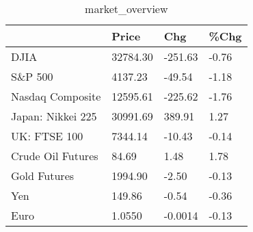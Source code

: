 \documentclass{article}%
\begin{document}
%


\begin{table}[htbp]%
\caption{market\_overview}%
\centering%
\begin{adjustbox}{width=1\textwidth}%
\begin{tabular}{llll}
\toprule
                  &    Price &     Chg &  \%Chg \\
\midrule
             DJIA & 32784.30 & -251.63 & -0.76 \\
          S\&P 500 &  4137.23 &  -49.54 & -1.18 \\
 Nasdaq Composite & 12595.61 & -225.62 & -1.76 \\
Japan: Nikkei 225 & 30991.69 &  389.91 &  1.27 \\
     UK: FTSE 100 &  7344.14 &  -10.43 & -0.14 \\
Crude Oil Futures &    84.69 &    1.48 &  1.78 \\
     Gold Futures &  1994.90 &   -2.50 & -0.13 \\
              Yen &   149.86 &   -0.54 & -0.36 \\
             Euro &   1.0550 & -0.0014 & -0.13 \\
\bottomrule
\end{tabular}
%
\end{adjustbox}%
\end{table}

%
\end{document}
